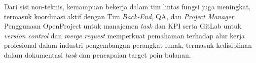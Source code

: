 Dari sisi non-teknis, kemampuan bekerja dalam tim lintas fungsi juga meningkat,
termasuk koordinasi aktif dengan Tim \textit{Back-End}, QA, dan \textit{Project
    Manager}. Penggunaan OpenProject untuk manajemen \textit{task} dan KPI serta
GitLab untuk \textit{version control} dan \textit{merge request} memperkuat
pemahaman terhadap alur kerja profesional dalam industri pengembangan perangkat
lunak, termasuk kedisiplinan dalam dokumentasi \textit{task} dan pencapaian
target poin bulanan.